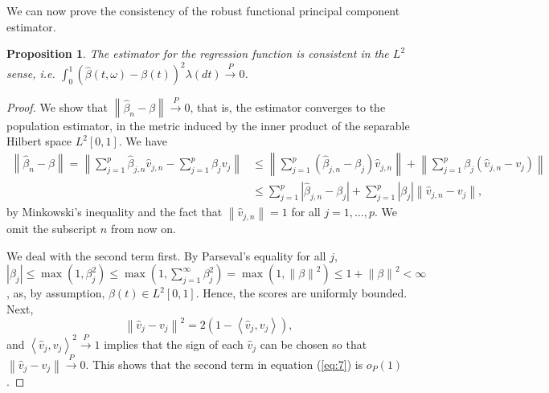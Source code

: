 \documentclass[11pt]{article}
\newtheorem{prop}{Proposition}[section]
\begin{document}
We can now prove the consistency of the robust functional principal component estimator.

\begin{prop}
The estimator for the regression function is consistent in the $L^2$ sense, i.e. $\int_{0}^{1} \left( \widehat{\beta}(t, \omega) - \beta (t) \right)^2 \lambda(dt) \xrightarrow{P} 0$.
\end{prop}

\begin{proof}

We show that $\left\| \widehat{\beta}_n - \beta \right\| \xrightarrow{P} 0 $, that is, the estimator converges to the population estimator, in the metric induced by the inner product of the separable Hilbert space $L^2[0,1]$. We have
\begin{align}
\label{eq:27}
\left\| \widehat{\beta}_n - \beta \right\|  = \left\| \sum_{j=1}^p \widehat{\beta}_{j,n} \widehat{v}_{j,n} - \sum_{j=1}^p \beta_j v_j  \right\| \nonumber  & \leq \left\| \sum_{j=1}^p \left( \widehat{\beta}_{j,n} - \beta_j \right) \widehat{v}_{j,n} \right\| + \left\| \sum_{j=1}^p \beta_j \left(\widehat{v}_{j,n} - v_j \right) \right\| \nonumber 
\\ &\leq \sum_{j=1}^p \left| \widehat{\beta}_{j,n} - \beta_j \right| + \sum_{j=1}^p \left| \beta_j \right| \left\| \widehat{v}_{j,n} - v_j \right\|,
\end{align}
by Minkowski's inequality and the fact that $\left\|\widehat{v}_{j,n} \right\| = 1$ for all $j = 1, \ldots, p$. We omit the subscript $n$ from now on.

We deal with the second term first.  By Parseval's equality for all $j$, $\left|\beta_j\right| \leq \max\left(1, \beta_j^2\right)\leq  \max\left(1, \sum_{j=1}^{\infty}\beta_j^2\right) = \max\left(1, \left\| \beta \right\|^2\right) \leq 1 + \left\| \beta \right\|^2 < \infty$, as, by assumption, $\beta(t)\in L^2 \left[0,1\right]$. Hence, the scores are uniformly bounded. Next,  
\begin{equation*}
\left\|\widehat{v}_{j} - v_j \right\|^2 = 2\left( 1-\left\langle\widehat{v}_{j}, v_j \right\rangle  \right),
\end{equation*}
and $\left\langle \widehat{v}_{j}, v_j \right\rangle^2 \xrightarrow{P}1$ implies that the sign of each $\widehat{v}_j$ can be chosen so that $\left\|\widehat{v}_{j} - v_j \right\| \xrightarrow{P} 0$. This shows that the second term in equation (\ref{eq:7}) is $o_{P}(1)$.


\end{proof}
\end{document}
